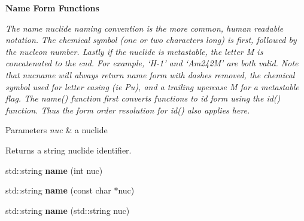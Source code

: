 \begin{Indent}\textbf{ Name Form Functions}\par
{\em The \textquotesingle{}name\textquotesingle{} nuclide naming convention is the more common, human readable notation. The chemical symbol (one or two characters long) is first, followed by the nucleon number. Lastly if the nuclide is metastable, the letter M is concatenated to the end. For example, ‘\+H-\/1’ and ‘\+Am242\+M’ are both valid. Note that nucname will always return name form with dashes removed, the chemical symbol used for letter casing (ie \textquotesingle{}Pu\textquotesingle{}), and a trailing upercase \textquotesingle{}M\textquotesingle{} for a metastable flag. The name() function first converts functions to id form using the id() function. Thus the form order resolution for id() also applies here. 
\begin{DoxyParams}{Parameters}
{\em nuc} & a nuclide \\
\hline
\end{DoxyParams}
\begin{DoxyReturn}{Returns}
a string nuclide identifier. 
\end{DoxyReturn}
}\begin{DoxyCompactItemize}
\item 
\mbox{\label{namespacepyne_1_1nucname_a70117a5d74d65b210c635c662e08fe10}} 
std\+::string {\bfseries name} (int nuc)
\item 
\mbox{\label{namespacepyne_1_1nucname_a75738980b674158abff6ea0c60d0900f}} 
std\+::string {\bfseries name} (const char $\ast$nuc)
\item 
\mbox{\label{namespacepyne_1_1nucname_adfcf9a3fc2217ba23e93ce5915bad706}} 
std\+::string {\bfseries name} (std\+::string nuc)
\end{DoxyCompactItemize}
\end{Indent}
